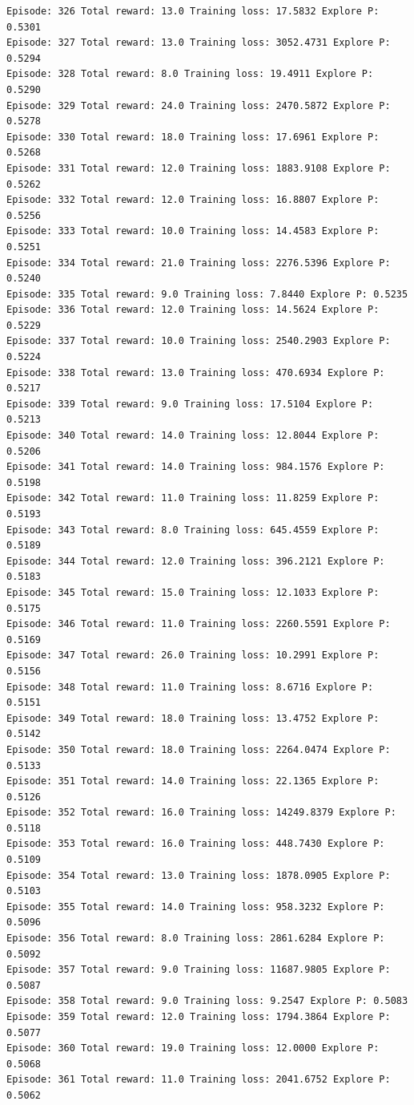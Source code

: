 \documentclass[11pt]{article}
\begin{document}
\begin{Verbatim}[commandchars=\\\{\}]
Episode: 326 Total reward: 13.0 Training loss: 17.5832 Explore P: 0.5301
Episode: 327 Total reward: 13.0 Training loss: 3052.4731 Explore P: 0.5294
Episode: 328 Total reward: 8.0 Training loss: 19.4911 Explore P: 0.5290
Episode: 329 Total reward: 24.0 Training loss: 2470.5872 Explore P: 0.5278
Episode: 330 Total reward: 18.0 Training loss: 17.6961 Explore P: 0.5268
Episode: 331 Total reward: 12.0 Training loss: 1883.9108 Explore P: 0.5262
Episode: 332 Total reward: 12.0 Training loss: 16.8807 Explore P: 0.5256
Episode: 333 Total reward: 10.0 Training loss: 14.4583 Explore P: 0.5251
Episode: 334 Total reward: 21.0 Training loss: 2276.5396 Explore P: 0.5240
Episode: 335 Total reward: 9.0 Training loss: 7.8440 Explore P: 0.5235
Episode: 336 Total reward: 12.0 Training loss: 14.5624 Explore P: 0.5229
Episode: 337 Total reward: 10.0 Training loss: 2540.2903 Explore P: 0.5224
Episode: 338 Total reward: 13.0 Training loss: 470.6934 Explore P: 0.5217
Episode: 339 Total reward: 9.0 Training loss: 17.5104 Explore P: 0.5213
Episode: 340 Total reward: 14.0 Training loss: 12.8044 Explore P: 0.5206
Episode: 341 Total reward: 14.0 Training loss: 984.1576 Explore P: 0.5198
Episode: 342 Total reward: 11.0 Training loss: 11.8259 Explore P: 0.5193
Episode: 343 Total reward: 8.0 Training loss: 645.4559 Explore P: 0.5189
Episode: 344 Total reward: 12.0 Training loss: 396.2121 Explore P: 0.5183
Episode: 345 Total reward: 15.0 Training loss: 12.1033 Explore P: 0.5175
Episode: 346 Total reward: 11.0 Training loss: 2260.5591 Explore P: 0.5169
Episode: 347 Total reward: 26.0 Training loss: 10.2991 Explore P: 0.5156
Episode: 348 Total reward: 11.0 Training loss: 8.6716 Explore P: 0.5151
Episode: 349 Total reward: 18.0 Training loss: 13.4752 Explore P: 0.5142
Episode: 350 Total reward: 18.0 Training loss: 2264.0474 Explore P: 0.5133
Episode: 351 Total reward: 14.0 Training loss: 22.1365 Explore P: 0.5126
Episode: 352 Total reward: 16.0 Training loss: 14249.8379 Explore P: 0.5118
Episode: 353 Total reward: 16.0 Training loss: 448.7430 Explore P: 0.5109
Episode: 354 Total reward: 13.0 Training loss: 1878.0905 Explore P: 0.5103
Episode: 355 Total reward: 14.0 Training loss: 958.3232 Explore P: 0.5096
Episode: 356 Total reward: 8.0 Training loss: 2861.6284 Explore P: 0.5092
Episode: 357 Total reward: 9.0 Training loss: 11687.9805 Explore P: 0.5087
Episode: 358 Total reward: 9.0 Training loss: 9.2547 Explore P: 0.5083
Episode: 359 Total reward: 12.0 Training loss: 1794.3864 Explore P: 0.5077
Episode: 360 Total reward: 19.0 Training loss: 12.0000 Explore P: 0.5068
Episode: 361 Total reward: 11.0 Training loss: 2041.6752 Explore P: 0.5062

\end{Verbatim}
\end{document}
